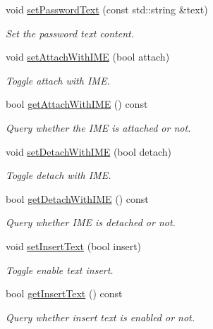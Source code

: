 \begin{DoxyCompactItemize}
void \hyperlink{classui_1_1UICCTextField_a5dd72d55d3859c50ca346d0a76b66bfa}{set\+Password\+Text} (const std\+::string \&text)
\begin{DoxyCompactList}\small\item\em Set the password text content. \end{DoxyCompactList}\item 
void \hyperlink{classui_1_1UICCTextField_ac3f1fe1e8d88650662ffa07b4f1063d5}{set\+Attach\+With\+I\+ME} (bool attach)
\begin{DoxyCompactList}\small\item\em Toggle attach with I\+ME. \end{DoxyCompactList}\item 
bool \hyperlink{classui_1_1UICCTextField_a101f42cff95aabcc31b1be1d6d84795d}{get\+Attach\+With\+I\+ME} () const
\begin{DoxyCompactList}\small\item\em Query whether the I\+ME is attached or not. \end{DoxyCompactList}\item 
void \hyperlink{classui_1_1UICCTextField_a93a1fd10bfd3f6547045320b605f8987}{set\+Detach\+With\+I\+ME} (bool detach)
\begin{DoxyCompactList}\small\item\em Toggle detach with I\+ME. \end{DoxyCompactList}\item 
bool \hyperlink{classui_1_1UICCTextField_a834dc8e546abd0b02437018e97bbce71}{get\+Detach\+With\+I\+ME} () const
\begin{DoxyCompactList}\small\item\em Query whether I\+ME is detached or not. \end{DoxyCompactList}\item 
void \hyperlink{classui_1_1UICCTextField_a27a756bfbc4d7adbdb0015756ef399ef}{set\+Insert\+Text} (bool insert)
\begin{DoxyCompactList}\small\item\em Toggle enable text insert. \end{DoxyCompactList}\item 
bool \hyperlink{classui_1_1UICCTextField_a789a293f8c433f6f434e57f8438193ab}{get\+Insert\+Text} () const
\begin{DoxyCompactList}\small\item\em Query whether insert text is enabled or not. \end{DoxyCompactList}\item 

\end{DoxyCompactItemize}
